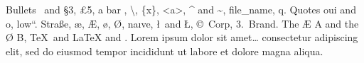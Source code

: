 \documentclass{article}
\begin{document}
Bullets \textbullet\ and \S 3, \pounds 5, a bar \textbar, \textbackslash, \{x\}, \textless a\textgreater, \textasciicircum{} and \textasciitilde, file\_name, \textquotedbl q\textquotedbl.
Quotes \guillemotleft oui\guillemotright{} and \guilsinglleft o\guilsinglright, \quotedblbase low\textquotedblleft.
Stra\ss e, \ae, \AE, \o, \O, na\i ve, \l\ and \L, \copyright\ Corp, 3.\textordmasculine\ Brand\texttrademark.
The \AE{} A and the \O{} B, \TeX\ and \LaTeX{} and \LaTeXe.
Lorem ipsum dolor sit amet\ldots{} consectetur adipiscing elit, sed do eiusmod tempor incididunt ut labore et dolore magna aliqua.
\end{document}
